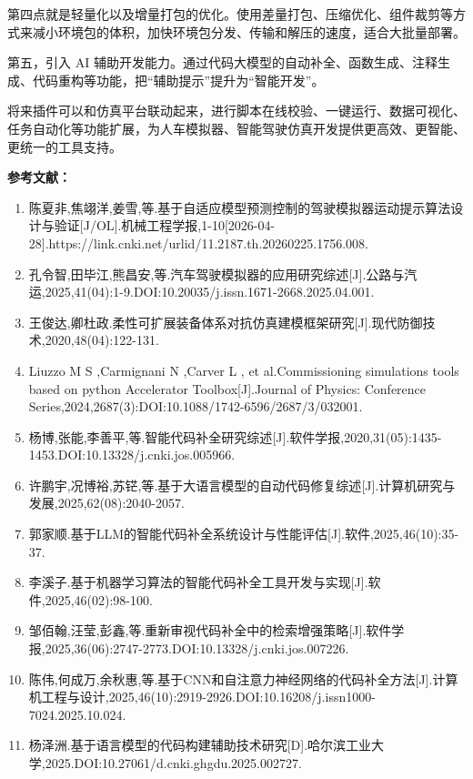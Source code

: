 第四点就是轻量化以及增量打包的优化。使用差量打包、压缩优化、组件裁剪等方式来减小环境包的体积，加快环境包分发、传输和解压的速度，适合大批量部署。

第五，引入 AI
辅助开发能力。通过代码大模型的自动补全、函数生成、注释生成、代码重构等功能，把``辅助提示''提升为``智能开发''。

将来插件可以和仿真平台联动起来，进行脚本在线校验、一键运行、数据可视化、任务自动化等功能扩展，为人车模拟器、智能驾驶仿真开发提供更高效、更智能、更统一的工具支持。

\textbf{参考文献：}

\begin{enumerate}
\def\labelenumi{\arabic{enumi}.}
\item
  陈夏非,焦翊洋,姜雪,等.基于自适应模型预测控制的驾驶模拟器运动提示算法设计与验证{[}J/OL{]}.机械工程学报,1-10{[}2026-04-28{]}.https://link.cnki.net/urlid/11.2187.th.20260225.1756.008.
\item
  孔令智,田毕江,熊昌安,等.汽车驾驶模拟器的应用研究综述{[}J{]}.公路与汽运,2025,41(04):1-9.DOI:10.20035/j.issn.1671-2668.2025.04.001.
\item
  王俊达,卿杜政.柔性可扩展装备体系对抗仿真建模框架研究{[}J{]}.现代防御技术,2020,48(04):122-131.
\item
  Liuzzo M S ,Carmignani N ,Carver L , et al.Commissioning simulations
  tools based on python Accelerator Toolbox{[}J{]}.Journal of Physics:
  Conference Series,2024,2687(3):DOI:10.1088/1742-6596/2687/3/032001.
\item
  杨博,张能,李善平,等.智能代码补全研究综述{[}J{]}.软件学报,2020,31(05):1435-1453.DOI:10.13328/j.cnki.jos.005966.
\item
  许鹏宇,况博裕,苏铓,等.基于大语言模型的自动代码修复综述{[}J{]}.计算机研究与发展,2025,62(08):2040-2057.
\item
  郭家顺.基于LLM的智能代码补全系统设计与性能评估{[}J{]}.软件,2025,46(10):35-37.
\item
  李溪子.基于机器学习算法的智能代码补全工具开发与实现{[}J{]}.软件,2025,46(02):98-100.
\item
  邹佰翰,汪莹,彭鑫,等.重新审视代码补全中的检索增强策略{[}J{]}.软件学报,2025,36(06):2747-2773.DOI:10.13328/j.cnki.jos.007226.
\item
  陈伟,何成万,余秋惠,等.基于CNN和自注意力神经网络的代码补全方法{[}J{]}.计算机工程与设计,2025,46(10):2919-2926.DOI:10.16208/j.issn1000-7024.2025.10.024.
\item
  杨泽洲.基于语言模型的代码构建辅助技术研究{[}D{]}.哈尔滨工业大学,2025.DOI:10.27061/d.cnki.ghgdu.2025.002727.

\end{enumerate}
